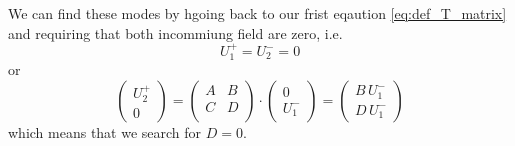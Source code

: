 We can find these modes by hgoing back to our frist eqaution \ref{eq:def_T_matrix} and requiring that both incommiung field are zero, i.e. 
\begin{equation}
U_1^+ = U_2^- = 0
\end{equation}
or
\begin{equation}
\begin{pmatrix}
U_2^+ \\ 0
\end{pmatrix}
= 
\begin{pmatrix}
A & B \\ C & D \\
\end{pmatrix}
\cdot
\begin{pmatrix}
0 \\ U_1^-
\end{pmatrix}
= 
\begin{pmatrix}
B \, U_1^- \\ D \, U_1^-
\end{pmatrix}
\end{equation}
which means that we search for $D =0$. 


